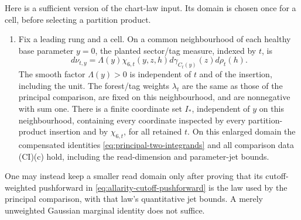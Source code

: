 Here is a sufficient version of the chart-law input. Its domain is
chosen once for a cell, before selecting a partition product.
\begin{enumerate}
\item[(M)] Fix a leading rung and a cell. On a common neighbourhood of
 each healthy base parameter $y=0$, the planted sector/tag measure,
 indexed by $t$, is
 \[
 d\nu_{t,y}=\Lambda(y)\chi_{6,t}(y,z,h)
                    d\gamma_{C_t(y)}(z)d\rho_t(h).
 \]
 The smooth factor $\Lambda(y)>0$ is independent of $t$ and of the
 insertion, including the unit. The forest/tag weights $\lambda_t$
 are the same as those of the principal comparison, are fixed on this
 neighbourhood, and are nonnegative with sum one. There is a finite
 coordinate set $I_*$, independent of $y$ on this neighbourhood,
 containing every coordinate inspected by every partition-product
 insertion and by $\chi_{6,t}$, for all retained $t$. On this enlarged
 domain the compensated identities
 \eqref{eq:principal-two-integrands} and all comparison data (CI)(c)
 hold, including the read-dimension and parameter-jet bounds.
\end{enumerate}
One may instead keep a smaller read domain only after proving that
its cutoff-weighted pushforward in
\eqref{eq:allarity-cutoff-pushforward} is the law used by the principal
comparison, with that law's quantitative jet bounds. A merely
unweighted Gaussian marginal identity does not suffice.


